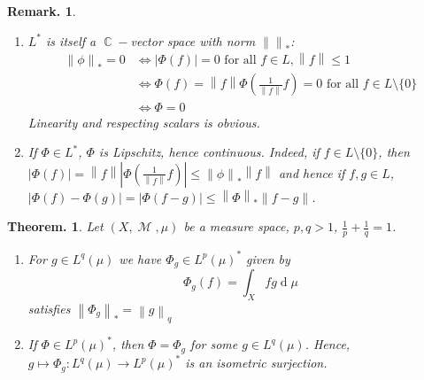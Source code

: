 \documentclass[11pt, a4paper]{memoir}
\DeclareMathOperator{\C}{{\mathbb{C}}}
\newcommand{\norm}[1]{\ensuremath{\left\lVert#1\right\rVert}}
\theoremstyle{change}
\newtheorem{theorem}{Theorem.}[section]
\theoremstyle{plain}
\theoremstyle{nonumberplain}
\newtheorem{remark}{Remark.}
\DeclareMathOperator{\M}{{\mathcal{M}}}
\renewcommand{\d}[1]{\ensuremath{\operatorname{d}\!{#1}}}
\numberwithin{equation}{section}
\begin{document}
\begin{remark}
    \begin{enumerate}
        \item $L^*$ is itself a $\C-$vector space with norm $\norm{}_*$:
            \begin{align*}
                \norm{\phi}_*=0 &\Leftrightarrow |\Phi(f)|=0\text{ for all $f\in L$}, \norm{f}\leq 1\\
                                &\Leftrightarrow \Phi(f)=\norm{f}\Phi\left(\frac{1}{\norm{f}}f\right)=0\text{ for all }f\in L\setminus\{0\}\\
                                &\Leftrightarrow \Phi=0
            \end{align*}
            Linearity and respecting scalars is obvious.
        \item If $\Phi\in L^*$, $\Phi$ is Lipschitz, hence continuous.
            Indeed, if $f\in L\setminus\{0\}$, then $|\Phi(f)|=\norm{f}\left\lvert\Phi\left(\frac{1}{\norm{f}}f\right)\right\rvert\leq\norm{\phi}_*\norm{f}$ and hence if $f,g\in L$, $|\Phi(f)-\Phi(g)|=|\Phi(f-g)|\leq\norm{\Phi}_*\norm{f-g}$.
    \end{enumerate}
\end{remark}
\begin{theorem}
    Let $(X,\M,\mu)$ be a measure space, $p,q>1$, $\frac{1}{p}+\frac{1}{q}=1$.
    \begin{enumerate}[nl,r]
        \item For $g\in L^q(\mu)$ we have $\Phi_g\in L^p(\mu)^*$ given by
            \begin{equation*}
                \Phi_g(f)=\int_X fg\d{\mu}
            \end{equation*}
            satisfies $\norm{\Phi_g}_*=\norm{g}_q$
        \item If $\Phi\in L^p(\mu)^*$, then $\Phi=\Phi_g$ for some $g\in L^q(\mu)$.
            Hence, $g\mapsto\Phi_g:L^q(\mu)\to L^p(\mu)^*$ is an isometric surjection.
    \end{enumerate}
\end{theorem}
\end{document}
